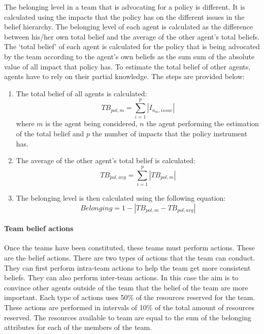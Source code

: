 The belonging level in a team that is advocating for a policy is different. It is calculated using the impacts that the policy has on the different issues in the belief hierarchy. The belonging level of each agent is calculated as the difference between his/her own total belief and the average of the other agent’s total beliefs. The ‘total belief’ of each agent is calculated for the policy that is being advocated by the team according to the agent’s own beliefs as the sum sum of the absolute value of all impact that policy has. To estimate the total belief of other agents, agents have to rely on their partial knowledge. The steps are provided below:

\begin{enumerate}
\item The total belief of all agents is calculated:
	\begin{equation}
	TB_{pol, m} = \sum_{i=1}^p |I_{n_m, issue}|
	\end{equation}
	where $m$ is the agent being considered, $n$ the agent performing the estimation of the total belief and $p$ the number of impacts that the policy instrument has.

\item The average of the other agent’s total belief is calculated:
	\begin{equation}
	TB_{pol, avg} = \sum_{i=1}^p |TB_{pol,m}|
	\end{equation}

\item The belonging level is then calculated using the following equation:
	\begin{equation}
	Belonging = 1 - \left| TB_{pol,m} - TB_{pol, avg} \right|
	\end{equation}
\end{enumerate}

\paragraph{Team belief actions}

Once the teams have been constituted, these teams must perform actions. These are the belief actions. There are two types of actions that the team can conduct. They can first perform intra-team actions to help the team get more consistent beliefs. They can also perform inter-team actions. In this case the aim is to convince other agents outside of the team that the belief of the team are more important. Each type of actions uses 50\% of the resources reserved for the team. These actions are performed in intervals of 10\% of the total amount of resources reserved. The resources available to team are equal to the sum of the belonging attributes for each of the members of the team.

